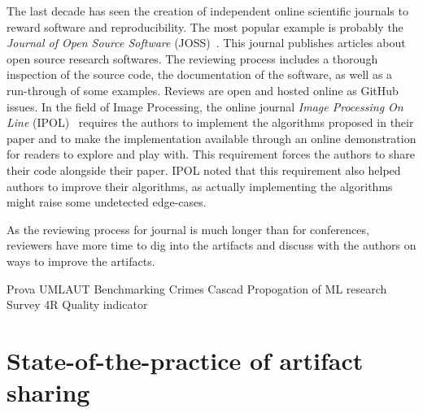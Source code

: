 \documentclass[sigconf,natbib=false]{acmart}
\newcommand{\ad}{Artifact Description}
\newcommand{\aeval}{Artifact Evaluation}
\newcommand{\adae}{\ad/\aeval}
\newcommand{\todo}[1]{{\color{red}{TODO: #1}}}
\begin{document}
The last decade has seen the creation of independent online scientific journals to reward software and reproducibility.
The most popular example is probably the \emph{Journal of Open Source Software} (JOSS)\ \cite{smith2018journal}.
This journal publishes articles about open source research softwares.
The reviewing process includes a thorough inspection of the source code, the documentation of the software, as well as a run-through of some examples.
Reviews are open and hosted online as GitHub issues.
In the field of Image Processing, the online journal \emph{Image Processing On Line} (IPOL)\ \cite{colom2015ipol} requires the authors to implement the algorithms proposed in their paper and to make the implementation available through an online demonstration for readers to explore and play with.
This requirement forces the authors to share their code alongside their paper.
IPOL noted that this requirement also helped authors to improve their algorithms, as actually implementing the algorithms might raise some undetected edge-cases.

As the reviewing process for journal is much longer than for conferences, reviewers have more time to dig into the artifacts and discuss with the authors on ways to improve the artifacts.



Prova \cite{guerrera2019reproducible}
UMLAUT \cite{umlaut}
Benchmarking Crimes \cite{van2018benchmarking}
Cascad \cite{perignon2019certify}
Propogation of ML research  \cite{kang2023papers}
Survey 4R \cite{hernandez2023repeatability}
Quality indicator \cite{castell2024towards}
\cite{winter2022retrospective}
\cite{hermann2022has}



%
%

%
\section{State-of-the-practice of artifact sharing}\label{sec:sop}
\end{document}
